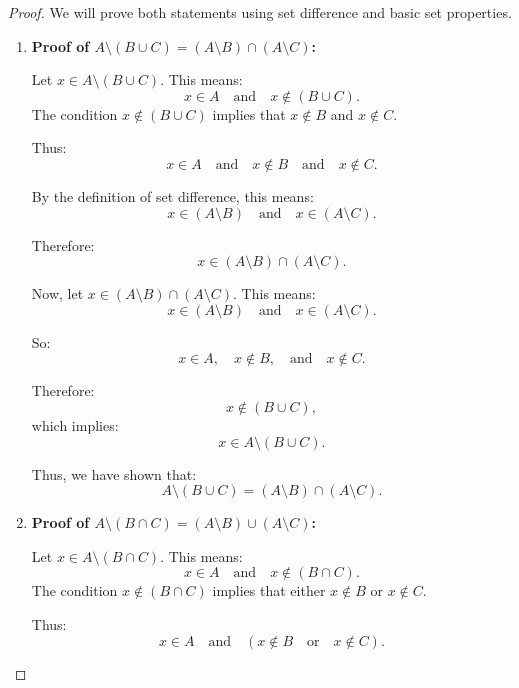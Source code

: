 \begin{proof}
    We will prove both statements using set difference and basic set properties.

    \begin{enumerate}
        \item \textbf{Proof of \( A \setminus (B \cup C) = (A \setminus B) \cap (A \setminus C) \):}
    
        Let \( x \in A \setminus (B \cup C) \). This means:
        \[
        x \in A \quad \text{and} \quad x \notin (B \cup C).
        \]
        The condition \( x \notin (B \cup C) \) implies that \( x \notin B \) and \( x \notin C \).
        
        Thus:
        \[
        x \in A \quad \text{and} \quad x \notin B \quad \text{and} \quad x \notin C.
        \]
        
        By the definition of set difference, this means:
        \[
        x \in (A \setminus B) \quad \text{and} \quad x \in (A \setminus C).
        \]
        
        Therefore:
        \[
        x \in (A \setminus B) \cap (A \setminus C).
        \]
        
        Now, let \( x \in (A \setminus B) \cap (A \setminus C) \). This means:
        \[
        x \in (A \setminus B) \quad \text{and} \quad x \in (A \setminus C).
        \]
        
        So:
        \[
        x \in A, \quad x \notin B, \quad \text{and} \quad x \notin C.
        \]
        
        Therefore:
        \[
        x \notin (B \cup C),
        \]
        which implies:
        \[
        x \in A \setminus (B \cup C).
        \]
        
        Thus, we have shown that:
        \[
        A \setminus (B \cup C) = (A \setminus B) \cap (A \setminus C).
        \]

        \item \textbf{Proof of \( A \setminus (B \cap C) = (A \setminus B) \cup (A \setminus C) \):}
    
        Let \( x \in A \setminus (B \cap C) \). This means:
        \[
        x \in A \quad \text{and} \quad x \notin (B \cap C).
        \]
        The condition \( x \notin (B \cap C) \) implies that either \( x \notin B \) or \( x \notin C \).
        
        Thus:
        \[
        x \in A \quad \text{and} \quad (x \notin B \quad \text{or} \quad x \notin C).
        \]
        

\end{enumerate}
\end{proof}
